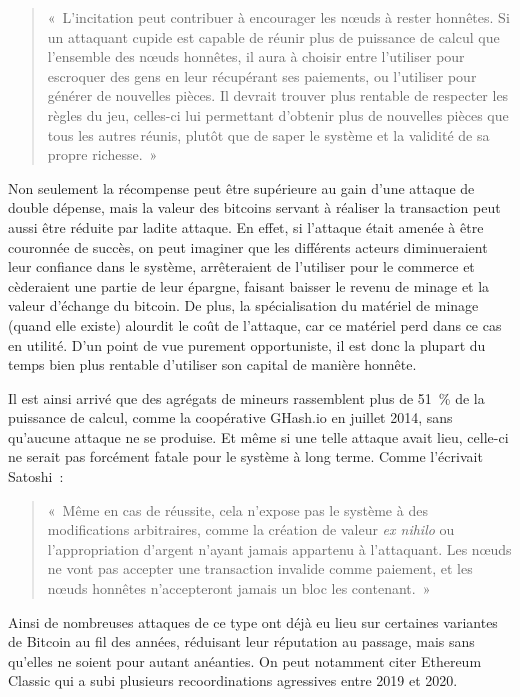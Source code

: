 \begin{quote}
«~L'incitation peut contribuer à encourager les nœuds à rester honnêtes. Si un attaquant cupide est capable de réunir plus de puissance de calcul que l'ensemble des nœuds honnêtes, il aura à choisir entre l'utiliser pour escroquer des gens en leur récupérant ses paiements, ou l'utiliser pour générer de nouvelles pièces. Il devrait trouver plus rentable de respecter les règles du jeu, celles-ci lui permettant d'obtenir plus de nouvelles pièces que tous les autres réunis, plutôt que de saper le système et la validité de sa propre richesse.~»
\end{quote}

Non seulement la récompense peut être supérieure au gain d'une attaque de double dépense, mais la valeur des bitcoins servant à réaliser la transaction peut aussi être réduite par ladite attaque. En effet, si l'attaque était amenée à être couronnée de succès, on peut imaginer que les différents acteurs diminueraient leur confiance dans le système, arrêteraient de l'utiliser pour le commerce et cèderaient une partie de leur épargne, faisant baisser le revenu de minage et la valeur d'échange du bitcoin. De plus, la spécialisation du matériel de minage (quand elle existe) alourdit le coût de l'attaque, car ce matériel perd dans ce cas en utilité. D'un point de vue purement opportuniste, il est donc la plupart du temps bien plus rentable d'utiliser son capital de manière honnête.

Il est ainsi arrivé que des agrégats de mineurs rassemblent plus de 51~\% de la puissance de calcul, comme la coopérative GHash.io en juillet 2014, sans qu'aucune attaque ne se produise. Et même si une telle attaque avait lieu, celle-ci ne serait pas forcément fatale pour le système à long terme. Comme l'écrivait Satoshi~:

\begin{quote}
«~Même en cas de réussite, cela n'expose pas le système à des modifications arbitraires, comme la création de valeur \emph{ex nihilo} ou l'appropriation d'argent n'ayant jamais appartenu à l'attaquant. Les nœuds ne vont pas accepter une transaction invalide comme paiement, et les nœuds honnêtes n'accepteront jamais un bloc les contenant.~»
\end{quote}

Ainsi de nombreuses attaques de ce type ont déjà eu lieu sur certaines variantes de Bitcoin au fil des années, réduisant leur réputation au passage, mais sans qu'elles ne soient pour autant anéanties. On peut notamment citer Ethereum Classic qui a subi plusieurs recoordinations agressives entre 2019 et 2020.

